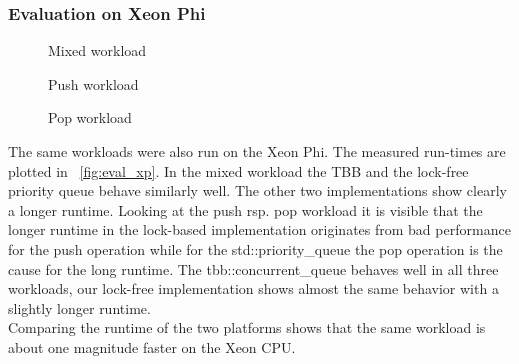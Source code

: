 \subsubsection{Evaluation on Xeon Phi}
\begin{figure*}[t]
	\centering
	\begin{subfigure}[b]{0.3\textwidth}
		\centering
		
		\caption{Mixed workload}
		\label{fig:xp_mixed}
	\end{subfigure}
	\hfill
	\begin{subfigure}[b]{0.3\textwidth}
		\centering
		
		\caption{Push workload}
		\label{fig:xp_push}
	\end{subfigure}
	\hfill
	\begin{subfigure}[b]{0.3\textwidth}
		\centering
		
		\caption{Pop workload}
		\label{fig:xp_pop}
	\end{subfigure}
	\caption{Runtime for different workloads executed on a Xeon Phi while varying the number of threads}
	\label{fig:eval_xp}
\end{figure*}
The same workloads were also run on the Xeon Phi. The measured run-times are plotted in \figurename~\ref{fig:eval_xp}. In the mixed workload the TBB and the lock-free priority queue behave similarly well. The other two implementations show clearly a longer runtime. Looking at the push rsp. pop workload it is visible that the longer runtime in the lock-based implementation originates from bad performance for the push operation while for the std::priority\_queue the pop operation is the cause for the long runtime. The tbb::concurrent\_queue behaves well in all three workloads, our lock-free implementation shows almost the same behavior with a slightly longer runtime.\\
Comparing the runtime of the two platforms shows that the same workload is about one magnitude faster on the Xeon CPU.


